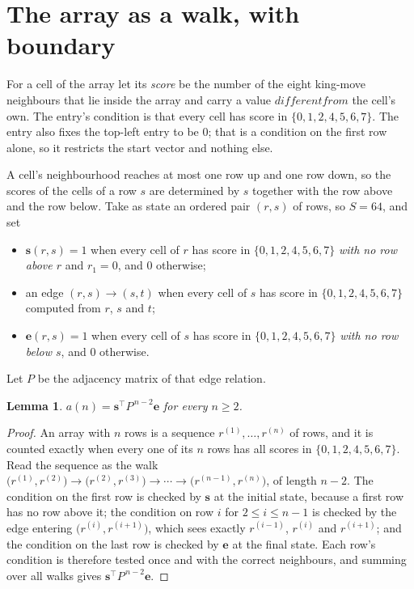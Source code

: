 \documentclass[11pt,a4paper]{article}
\theoremstyle{plain}
\newtheorem{lemma}[theorem]{Lemma}
\theoremstyle{definition}
\begin{document}
\section{The array as a walk, with boundary}

For a cell of the array let its \emph{score} be the number of the eight king-move neighbours that lie inside
the array and carry a value $different from$ the cell's own. The entry's condition is that every cell
has score in $\{0,1,2,4,5,6,7\}$. The entry also fixes the top-left entry to be $0$; that is a condition on the first row alone, so it restricts the start vector and nothing else.

A cell's neighbourhood reaches at most one row up and one row down, so the scores of the
cells of a row $s$ are determined by $s$ together with the row above and the row below.
Take as state an ordered pair $(r,s)$ of rows, so $S=64$, and set
\begin{itemize}
\item $\mathbf{s}(r,s)=1$ when every cell of $r$ has score in $\{0,1,2,4,5,6,7\}$ \emph{with no row
above $r$} and $r_1=0$, and $0$ otherwise;
\item an edge $(r,s)\to(s,t)$ when every cell of $s$ has score in $\{0,1,2,4,5,6,7\}$ computed from
$r$, $s$ and $t$;
\item $\mathbf{e}(r,s)=1$ when every cell of $s$ has score in $\{0,1,2,4,5,6,7\}$ \emph{with no row
below $s$}, and $0$ otherwise.
\end{itemize}
Let $P$ be the adjacency matrix of that edge relation.

\begin{lemma}\label{lem:walk}
$a(n)=\mathbf{s}^{\!\top}P^{\,n-2}\mathbf{e}$ for every $n\ge2$.
\end{lemma}

\begin{proof}
An array with $n$ rows is a sequence $r^{(1)},\dots,r^{(n)}$ of rows, and it is counted
exactly when every one of its $n$ rows has all scores in $\{0,1,2,4,5,6,7\}$. Read the sequence as the
walk $\bigl(r^{(1)},r^{(2)}\bigr)\to\bigl(r^{(2)},r^{(3)}\bigr)\to\cdots\to
\bigl(r^{(n-1)},r^{(n)}\bigr)$, of length $n-2$. The condition on the first row is
checked by $\mathbf{s}$ at the initial state, because a first row has no row above it; the
condition on row $i$ for $2\le i\le n-1$ is checked by the edge entering
$\bigl(r^{(i)},r^{(i+1)}\bigr)$, which sees exactly $r^{(i-1)}$, $r^{(i)}$ and
$r^{(i+1)}$; and the condition on the last row is checked by $\mathbf{e}$ at the final
state. Each row's condition is therefore tested once and with the correct neighbours, and
summing over all walks gives $\mathbf{s}^{\!\top}P^{\,n-2}\mathbf{e}$.
\end{proof}
\end{document}
